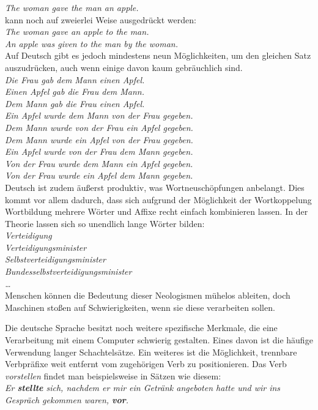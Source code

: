 \documentclass[]{../../metanetpaper}
\begin{document}
\begin{Parallel}[c]{80mm}{80mm}
{\textit{The woman gave the man an apple.}\\
kann noch auf zweierlei Weise ausgedrückt werden:\\
\textit{The woman gave an apple to the man.}\\
\textit{An apple was given to the man by the woman.}\\
Auf Deutsch gibt es jedoch mindestens neun Möglichkeiten, um den gleichen Satz auszudrücken, auch wenn einige davon kaum gebräuchlich sind.\\
\textit{Die Frau gab dem Mann einen Apfel.}\\
\textit{Einen Apfel gab die Frau dem Mann.}\\
\textit{Dem Mann gab die Frau einen Apfel.}\\
\textit{Ein Apfel wurde dem Mann von der Frau gegeben.}\\
\textit{Dem Mann wurde von der Frau ein Apfel gegeben.}\\
\textit{Dem Mann wurde ein Apfel von der Frau gegeben.}\\
\textit{Ein Apfel wurde von der Frau dem Mann gegeben.}\\
\textit{Von der Frau wurde dem Mann ein Apfel gegeben.}\\
\textit{Von der Frau wurde ein Apfel dem Mann gegeben.}\\
Deutsch ist zudem äußerst produktiv, was Wortneuschöpfungen anbelangt. Dies kommt vor allem dadurch, dass sich aufgrund der Möglichkeit der Wortkoppelung Wortbildung mehrere Wörter und Affixe recht einfach kombinieren lassen. In der Theorie lassen sich so unendlich lange Wörter bilden:\\
\textit{Verteidigung}\\
\textit{Verteidigungsminister}\\
\textit{Selbstverteidigungsminister}\\
\textit{Bundesselbstverteidigungsminister}\\
\textit{…}\\

Menschen können die Bedeutung dieser Neologismen mühelos ableiten, doch Maschinen stoßen auf Schwierigkeiten, wenn sie diese verarbeiten sollen. 

Die deutsche Sprache besitzt noch weitere spezifische Merkmale, die eine Verarbeitung mit einem Computer schwierig gestalten. Eines davon ist die häufige Verwendung langer Schachtelsätze. Ein weiteres ist die Möglichkeit, trennbare Verbpräfixe weit entfernt vom zugehörigen Verb zu positionieren. Das Verb \textit{vorstellen} findet man beispielsweise in Sätzen wie diesem:\\
\textit{Er \textbf{stellte} sich, nachdem er mir ein Getränk angeboten hatte und wir ins Gespräch gekommen waren, \textbf{vor}.\\}

}
\end{Parallel}
\end{document}
